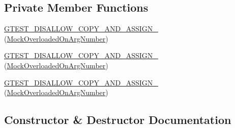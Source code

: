 \subsection*{Private Member Functions}
\begin{DoxyCompactItemize}
\item 
\mbox{\hyperlink{classtesting_1_1gmock__generated__function__mockers__test_1_1_mock_overloaded_on_arg_number_aeebad650a232bf9b290647b75975cae5}{G\+T\+E\+S\+T\+\_\+\+D\+I\+S\+A\+L\+L\+O\+W\+\_\+\+C\+O\+P\+Y\+\_\+\+A\+N\+D\+\_\+\+A\+S\+S\+I\+G\+N\+\_\+}} (\mbox{\hyperlink{classtesting_1_1gmock__generated__function__mockers__test_1_1_mock_overloaded_on_arg_number}{Mock\+Overloaded\+On\+Arg\+Number}})
\item 
\mbox{\hyperlink{classtesting_1_1gmock__generated__function__mockers__test_1_1_mock_overloaded_on_arg_number_aeebad650a232bf9b290647b75975cae5}{G\+T\+E\+S\+T\+\_\+\+D\+I\+S\+A\+L\+L\+O\+W\+\_\+\+C\+O\+P\+Y\+\_\+\+A\+N\+D\+\_\+\+A\+S\+S\+I\+G\+N\+\_\+}} (\mbox{\hyperlink{classtesting_1_1gmock__generated__function__mockers__test_1_1_mock_overloaded_on_arg_number}{Mock\+Overloaded\+On\+Arg\+Number}})
\item 
\mbox{\hyperlink{classtesting_1_1gmock__generated__function__mockers__test_1_1_mock_overloaded_on_arg_number_aeebad650a232bf9b290647b75975cae5}{G\+T\+E\+S\+T\+\_\+\+D\+I\+S\+A\+L\+L\+O\+W\+\_\+\+C\+O\+P\+Y\+\_\+\+A\+N\+D\+\_\+\+A\+S\+S\+I\+G\+N\+\_\+}} (\mbox{\hyperlink{classtesting_1_1gmock__generated__function__mockers__test_1_1_mock_overloaded_on_arg_number}{Mock\+Overloaded\+On\+Arg\+Number}})
\end{DoxyCompactItemize}


\subsection{Constructor \& Destructor Documentation}
\mbox{\label{classtesting_1_1gmock__generated__function__mockers__test_1_1_mock_overloaded_on_arg_number_ad5b40981c39bc0bec3b63632cf827153}} 

